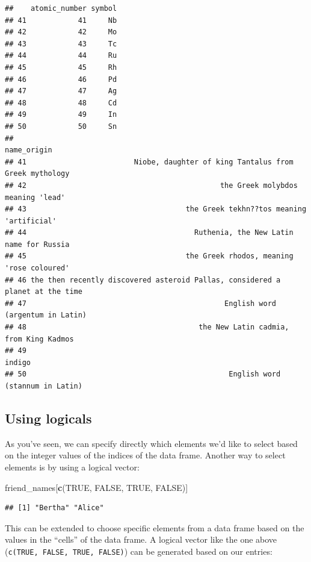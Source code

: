 \documentclass[]{tufte-book}
\newenvironment{Shaded}{\begin{snugshade}}{\end{snugshade}}
\newcommand{\ConstantTok}[1]{\textcolor[rgb]{0.56,0.35,0.01}{#1}}
\newcommand{\FunctionTok}[1]{\textcolor[rgb]{0.13,0.29,0.53}{\textbf{#1}}}
\newcommand{\NormalTok}[1]{#1}
\begin{document}
\begin{verbatim}
##    atomic_number symbol
## 41            41     Nb
## 42            42     Mo
## 43            43     Tc
## 44            44     Ru
## 45            45     Rh
## 46            46     Pd
## 47            47     Ag
## 48            48     Cd
## 49            49     In
## 50            50     Sn
##                                                                      name_origin
## 41                         Niobe, daughter of king Tantalus from Greek mythology
## 42                                             the Greek molybdos meaning 'lead'
## 43                                     the Greek tekhn??tos meaning 'artificial'
## 44                                       Ruthenia, the New Latin name for Russia
## 45                                     the Greek rhodos, meaning 'rose coloured'
## 46 the then recently discovered asteroid Pallas, considered a planet at the time
## 47                                              English word (argentum in Latin)
## 48                                        the New Latin cadmia, from King Kadmos
## 49                                                                        indigo
## 50                                               English word (stannum in Latin)
\end{verbatim}

\subsection{Using logicals}\label{using-logicals}

As you've seen, we can specify directly which elements we'd like to select based on the integer values of the indices of the data frame. Another way to select elements is by using a logical vector:

\begin{Shaded}
\begin{Highlighting}[]
\NormalTok{friend\_names[}\FunctionTok{c}\NormalTok{(}\ConstantTok{TRUE}\NormalTok{, }\ConstantTok{FALSE}\NormalTok{, }\ConstantTok{TRUE}\NormalTok{, }\ConstantTok{FALSE}\NormalTok{)]}
\end{Highlighting}
\end{Shaded}

\begin{verbatim}
## [1] "Bertha" "Alice"
\end{verbatim}

This can be extended to choose specific elements from a data frame based on the values in the ``cells'' of the data frame. A logical vector like the one above (\texttt{c(TRUE,\ FALSE,\ TRUE,\ FALSE)}) can be generated based on our entries:
\end{document}
